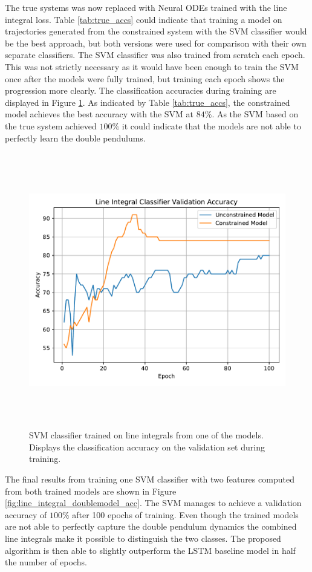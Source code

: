 \documentclass[12pt,a4paper]{book}
\begin{document}
The true systems was now replaced with Neural ODEs trained with the line integral loss. Table \ref{tab:true_accs} could indicate that training a model on trajectories generated from the constrained system with the SVM classifier would be the best approach, but both versions were used for comparison with their own separate classifiers. The SVM classifier was also trained from scratch each epoch. This was not strictly necessary as it would have been enough to train the SVM once after the models were fully trained, but training each epoch shows the progression more clearly. The classification accuracies during training are displayed in Figure \ref{fig:line_integral_singlemodel_acc}. As indicated by Table \ref{tab:true_accs}, the constrained model achieves the best accuracy with the SVM at $84 \%$. As the SVM based on the true system achieved $100 \%$ it could indicate that the models are not able to perfectly learn the double pendulums.

\begin{figure}[H]
    \centering
    \includegraphics[height=12cm]{figs/plots/motion_classification/line_integral_singlemodel_acc.pdf}
    \caption{SVM classifier trained on line integrals from one of the models. Displays the classification accuracy on the validation set during training.}
    \label{fig:line_integral_singlemodel_acc}
\end{figure}

The final results from training one SVM classifier with two features computed from both trained models are shown in Figure \ref{fig:line_integral_doublemodel_acc}. The SVM manages to achieve a validation accuracy of $100 \%$ after 100 epochs of training. Even though the trained models are not able to perfectly capture the double pendulum dynamics the combined line integrals make it possible to distinguish the two classes. The proposed algorithm is then able to slightly outperform the LSTM baseline model in half the number of epochs.
\end{document}
